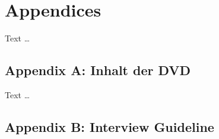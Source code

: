 \chapter*{Appendices}

Text \dots

{}
\section*{Appendix A: Inhalt der DVD}

Text \dots

{}
\section*{Appendix B: Interview Guideline}\label{appendix:interview_guideline}


